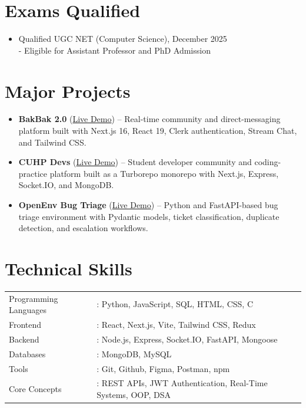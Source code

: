 \documentclass[11pt,a4paper]{article}
\begin{document}
\section*{Exams Qualified}

\begin{itemize}[leftmargin=*]
    \item Qualified UGC NET (Computer Science), December 2025 \\
     - Eligible for Assistant Professor and PhD Admission
\end{itemize}

\section*{Major Projects}

\begin{itemize}[leftmargin=*]
    \item \textbf{BakBak 2.0} (\href{https://bak-bak-2-0.vercel.app}{Live Demo}) -- Real-time community and direct-messaging platform built with Next.js 16, React 19, Clerk authentication, Stream Chat, and Tailwind CSS.

    \item \textbf{CUHP Devs} (\href{https://cuhp-devs-web.vercel.app}{Live Demo}) -- Student developer community and coding-practice platform built as a Turborepo monorepo with Next.js, Express, Socket.IO, and MongoDB.

    \item \textbf{OpenEnv Bug Triage} (\href{https://huggingface.co/spaces/TheOnlyKaks/my-env}{Live Demo}) -- Python and FastAPI-based bug triage environment with Pydantic models, ticket classification, duplicate detection, and escalation workflows.
\end{itemize}

\section*{Technical Skills}

\noindent
\begin{tabular}{@{} l l @{}}
Programming Languages & : Python, JavaScript, SQL, HTML, CSS, C \\
Frontend              & : React, Next.js, Vite, Tailwind CSS, Redux \\
Backend               & : Node.js, Express, Socket.IO, FastAPI, Mongoose \\
Databases             & : MongoDB, MySQL \\
Tools                 & : Git, Github, Figma, Postman, npm \\
Core Concepts         & : REST APIs, JWT Authentication, Real-Time Systems, OOP, DSA \\
\end{tabular}
\end{document}
